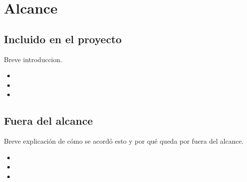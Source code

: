 \section{Alcance}
\label{section:alcance}

\subsection{Incluido en el proyecto}
Breve introduccion.

\begin{itemize}
  \item \tinylipsum
  \item \tinylipsum
  \item \tinylipsum
\end{itemize}

\subsection{Fuera del alcance}
Breve explicación de cómo se acordó esto y por qué queda por fuera del alcance.

\begin{itemize}
  \item \tinylipsum
  \item \tinylipsum
  \item \tinylipsum
\end{itemize}
